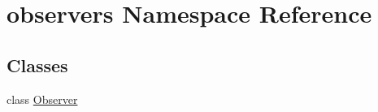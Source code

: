 \hypertarget{namespaceobservers}{\section{observers \-Namespace \-Reference}
\label{d6/d64/namespaceobservers}
}
\subsection*{\-Classes}
\begin{DoxyCompactItemize}
\item 
class \hyperlink{classobservers_1_1Observer}{\-Observer}
\end{DoxyCompactItemize}
